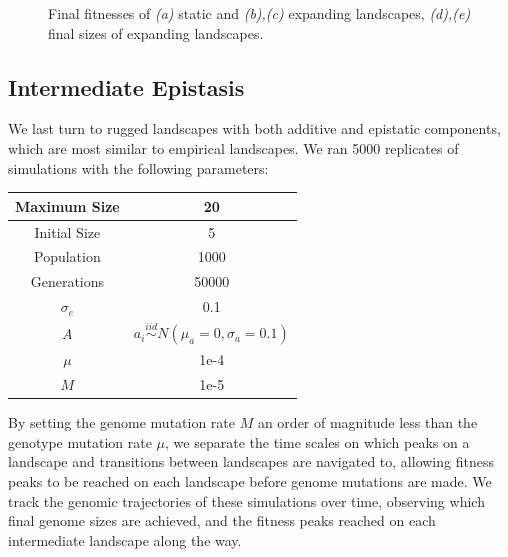 \documentclass[paper=a4, fontsize=11pt,twoside]{scrartcl}       %
\begin{document}
\begin{figure}[h!]
	\caption{Final fitnesses of \textit{(a)} static and \textit{(b),(c)} expanding landscapes, \textit{(d),(e)} final sizes of expanding landscapes.}
	\label{uncorrelated_fitnesses}
\end{figure}

\pagebreak

\subsection*{Intermediate Epistasis}

We last turn to rugged landscapes with both additive and epistatic components, which are most similar to empirical landscapes. We ran 5000 replicates of simulations with the following parameters:

\begin{center}
    \begin{tabular}{ | c | c | }
	\hline
	Maximum Size & 20 \\ \hline
	Initial Size & 5 \\ \hline
	Population & 1000 \\ \hline
	Generations & 50000 \\ \hline
	$\sigma_e$ & 0.1 \\ \hline
	$A$ &  $a_i \overset{iid}{\sim} N(\mu_a = 0, \sigma_a = 0.1)$ \\ \hline
	$\mu$  & 1e-4 \\ \hline
	$M$ & 1e-5 \\ \hline
    \end{tabular}
\end{center}

By setting the genome mutation rate $M$ an order of magnitude less than the genotype mutation rate $\mu$, we separate the time scales on which peaks on a landscape and transitions between landscapes are navigated to, allowing fitness peaks to be reached on each landscape before genome mutations are made. We track the genomic trajectories of these simulations over time, observing which final genome sizes are achieved, and the fitness peaks reached on each intermediate landscape along the way. 
\end{document}
